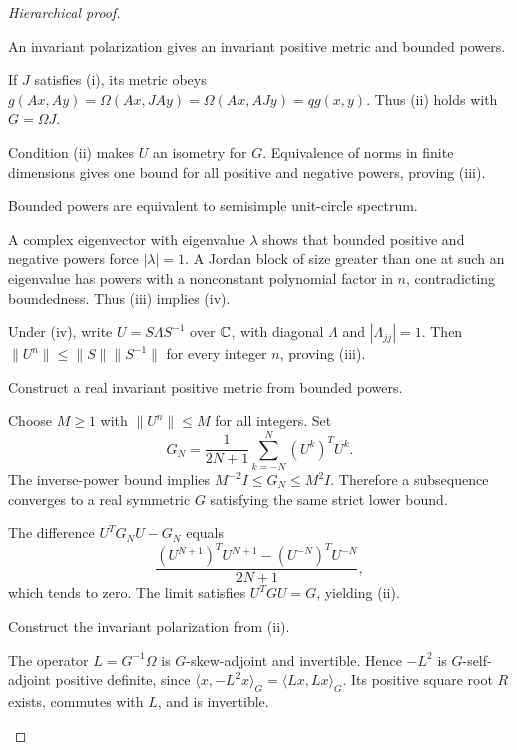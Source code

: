 \documentclass[11pt,a4paper]{article}
\theoremstyle{remark}\newtheorem{remark}[definition]{Remark}
\begin{document}
\begin{proof}[Hierarchical proof]
\begin{steps}
\item An invariant polarization gives an invariant positive metric and bounded powers.
\begin{steps}
\item If $J$ satisfies (i), its metric obeys
$g(Ax,Ay)=\Omega(Ax,JAy)=\Omega(Ax,AJy)=qg(x,y)$.
Thus (ii) holds with $G=\Omega J$.
\item Condition (ii) makes $U$ an isometry for $G$. Equivalence of norms in finite dimensions gives one bound for all positive and negative powers, proving (iii).
\end{steps}
\item Bounded powers are equivalent to semisimple unit-circle spectrum.
\begin{steps}
\item A complex eigenvector with eigenvalue $\lambda$ shows that bounded positive and negative powers force $|\lambda|=1$. A Jordan block of size greater than one at such an eigenvalue has powers with a nonconstant polynomial factor in $n$, contradicting boundedness. Thus (iii) implies (iv).
\item Under (iv), write $U=S\Lambda S^{-1}$ over $\mathbb C$, with diagonal $\Lambda$ and $|\Lambda_{jj}|=1$. Then $\|U^n\|\le\|S\|\|S^{-1}\|$ for every integer $n$, proving (iii).
\end{steps}
\item Construct a real invariant positive metric from bounded powers.
\begin{steps}
\item Choose $M\ge1$ with $\|U^n\|\le M$ for all integers. Set
\[
G_N=\frac1{2N+1}\sum_{k=-N}^{N}(U^k)^TU^k.
\]
The inverse-power bound implies $M^{-2}I\le G_N\le M^2I$. Therefore a subsequence converges to a real symmetric $G$ satisfying the same strict lower bound.
\item The difference $U^TG_NU-G_N$ equals
\[
\frac{(U^{N+1})^TU^{N+1}-(U^{-N})^TU^{-N}}{2N+1},
\]
which tends to zero. The limit satisfies $U^TGU=G$, yielding (ii).
\end{steps}
\item Construct the invariant polarization from (ii).
\begin{steps}
\item The operator $L=G^{-1}\Omega$ is $G$-skew-adjoint and invertible. Hence $-L^2$ is $G$-self-adjoint positive definite, since $\langle x,-L^2x\rangle_G=\langle Lx,Lx\rangle_G$. Its positive square root $R$ exists, commutes with $L$, and is invertible.

\end{steps}
\end{steps}
\end{proof}
\end{document}
